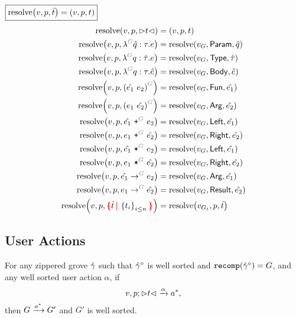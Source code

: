 \noindent
$\boxed{\operatorname{\text{resolve}}\mathopen{}\left(v, p, \hat{t}\right)\mathclose{} = (v, p, t)}$
%
\begin{align*}
  \resolve{v}{p}{\cursor{t}} &= (v, p, t) \\
  \resolve{v}{p}{\eFun{G}{\Z{q}}{\tau}{e}} &= \resolve{v_G}{\LamParam}{\Z{q}} \\
  \resolve{v}{p}{\eFun{G}{q}{\Z{\tau}}{e}} &= \resolve{v_G}{\LamType}{\Z{\tau}} \\
  \resolve{v}{p}{\eFun{G}{q}{\tau}{\Z{e}}} &= \resolve{v_G}{\LamBody}{\Z{e}} \\
  \resolve{v}{p}{\eApp{G}{\Z{e_1}}{e_2}} &= \resolve{v_G}{\AppFun}{\Z{e_1}} \\
  \resolve{v}{p}{\eApp{G}{e_1}{\Z{e_2}}} &= \resolve{v_G}{\AppArg}{\Z{e_2}} \\
  \resolve{v}{p}{\ePlus{G}{\Z{e_1}}{e_2}} &= \resolve{v_G}{\PlusLeft}{\Z{e_1}} \\
  \resolve{v}{p}{\ePlus{G}{e_1}{\Z{e_2}}} &= \resolve{v_G}{\PlusRight}{\Z{e_2}} \\
  \resolve{v}{p}{\eTimes{G}{\Z{e_1}}{e_2}} &= \resolve{v_G}{\TimesLeft}{\Z{e_1}} \\
  \resolve{v}{p}{\eTimes{G}{e_1}{\Z{e_2}}} &= \resolve{v_G}{\TimesRight}{\Z{e_2}} \\
  \resolve{v}{p}{\tArrow{G}{\Z{e_1}}{e_2}} &= \resolve{v_G}{\ArrowArg}{\Z{e_1}} \\
  \resolve{v}{p}{\tArrow{G}{e_1}{\Z{e_2}}} &= \resolve{v_G}{\ArrowResult}{\Z{e_2}} \\
  \resolve{v}{p}{\conflictHole{\Z{t}, \SetOf{t_i}_{i \leq n}}} &= \resolve{v_{G_t}}{p}{\Z{t}} \\
\end{align*}


\subsection{User Actions}

\begin{theorem}[Sensibility]
  For any zippered grove $\hat{\gamma}$
  such that $\hat{\gamma}\mathclose{}^{\diamond}\mathclose{}$ is well sorted
    and $\operatorname{\texttt{recomp}}\mathopen{}\left(\hat{\gamma}\mathclose{}^{\diamond}\mathclose{}\right)\mathclose{} = G$,
  and any well sorted user action $\alpha$,
  if
  \[
    v, p; {\vartriangleright}t{\vartriangleleft} \xrightarrow{\alpha} a^{*},
  \]
  then $G \xrightarrow{a^{*}} G'$ and $G'$ is well sorted.
\end{theorem}

